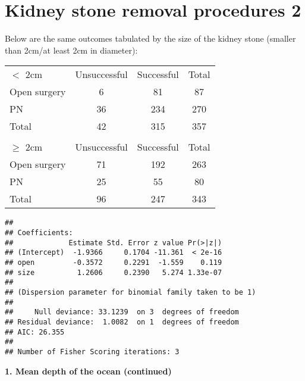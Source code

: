 \documentclass[10pt]{beamer}\usepackage[]{graphicx}\usepackage[]{color}
\makeatletter
\newenvironment{kframe}{%
 \def\at@end@of@kframe{}%
 \ifinner\ifhmode%
  \def\at@end@of@kframe{\end{minipage}}%
  \begin{minipage}{\columnwidth}%
 \fi\fi%
 \def\FrameCommand##1{\hskip\@totalleftmargin \hskip-\fboxsep
 \colorbox{shadecolor}{##1}\hskip-\fboxsep
     \hskip-\linewidth \hskip-\@totalleftmargin \hskip\columnwidth}%
 \MakeFramed {\advance\hsize-\width
   \@totalleftmargin\z@ \linewidth\hsize
   \@setminipage}}%
 {\par\unskip\endMakeFramed%
 \at@end@of@kframe}
\newenvironment{knitrout}{}{} %
\makeatother
\begin{document}
\section{Kidney stone removal procedures 2}

\begin{frame}
\vspace{-.91in}
\tiny
Below are the same outcomes tabulated by the size of the kidney stone (smaller than 2cm/at least 2cm in diameter):

\begin{table}[h]
	\centering
	\begin{tabular}{lcc|c}
		$<$ 2cm & Unsuccessful &  Successful & Total\\
		Open surgery & 6 & 81 & 87 \\
		PN 			 & 36 & 234 & 270 \\
		\hline
		Total 	& 42 & 315 & 357 \\
		& & &  \\
		$\geq$ 2cm & Unsuccessful &  Successful & Total\\
		Open surgery & 71 & 192 & 263 \\
		PN 			 & 25 & 55 & 80 \\
		\hline
		Total 		& 96 & 247 & 343
	\end{tabular}
\end{table}

\vspace{-.21in}
\begin{knitrout}\tiny
{}\color{fgcolor}\begin{kframe}
\begin{verbatim}
## 
## Coefficients:
##             Estimate Std. Error z value Pr(>|z|)
## (Intercept)  -1.9366     0.1704 -11.361  < 2e-16
## open         -0.3572     0.2291  -1.559    0.119
## size          1.2606     0.2390   5.274 1.33e-07
## 
## (Dispersion parameter for binomial family taken to be 1)
## 
##     Null deviance: 33.1239  on 3  degrees of freedom
## Residual deviance:  1.0082  on 1  degrees of freedom
## AIC: 26.355
## 
## Number of Fisher Scoring iterations: 3
\end{verbatim}
\end{kframe}
\end{knitrout}
\end{frame}

\begin{frame}
	\vspace*{-5.0in}
	\textbf{1. Mean depth of the ocean (continued)}
	
\end{frame}
\end{document}
